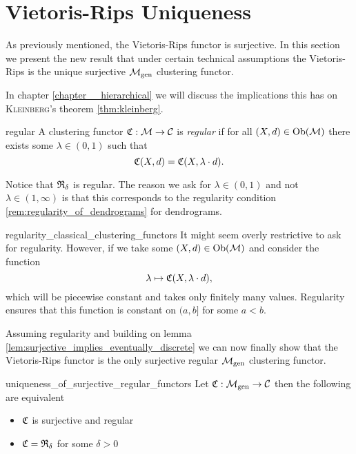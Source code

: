 \section[Vietoris-Rips Uniqueness]{Vietoris-Rips Uniqueness \newresult[]}

As previously mentioned, the Vietoris-Rips functor is surjective.
In this section we present the new result that under certain technical assumptions the Vietoris-Rips is the unique surjective ${\mathcal{M}_\mathrm{gen}}$ clustering functor.

In chapter \ref{chapter__hierarchical} we will discuss the implications this has on \textsc{Kleinberg}'s theorem \ref{thm:kleinberg}.

\begin{definition}{}{regular}
    A clustering functor $\mathfrak{C}: \mathcal{M} \to \mathcal{C}$ is \emph{regular} if for all $(X,d) \in \mathrm {Ob}(\mathcal{M})$ there exists some $\lambda \in (0, 1)$ such that
    $$
    \mathfrak{C}(X,d) = \mathfrak{C}(X, \lambda \cdot d).
    $$
    
\end{definition}

Notice that $\mathfrak{R}_\delta$ is regular. The reason we ask for $\lambda \in (0,1)$ and not $\lambda \in (1, \infty)$ is that this corresponds to the regularity condition \ref{rem:regularity_of_dendrograms} for dendrograms.\par

\begin{myremark}{}{regularity_classical_clustering_functors}
    \medskip It might seem overly restrictive to ask for regularity.
    However, if we take some $(X, d) \in \mathrm {Ob}(\mathcal{M})$ and consider the function 
    $$
    \lambda \mapsto \mathfrak{C}(X, \lambda \cdot d),
    $$
    which will be piecewise constant and takes only finitely many values.
    Regularity ensures that this function is constant on $(a, b]$ for some $a < b$.
\end{myremark}

Assuming regularity and building on lemma \ref{lem:surjective_implies_eventually_discrete} we can now finally show that the Vietoris-Rips functor is the only surjective regular ${\mathcal{M}_\mathrm{gen}}$ clustering functor.

\begin{theorem}{}{uniqueness_of_surjective_regular_functors}
    Let $\mathfrak{C}: {\mathcal{M}_\mathrm{gen}} \to \mathcal{C}$ then the following are equivalent

    \begin{itemize}
        \item $\mathfrak{C}$ is surjective and regular
        \item $\mathfrak{C} = \mathfrak{R}_{\delta}$ for some $\delta > 0$
    \end{itemize}
\end{theorem}


